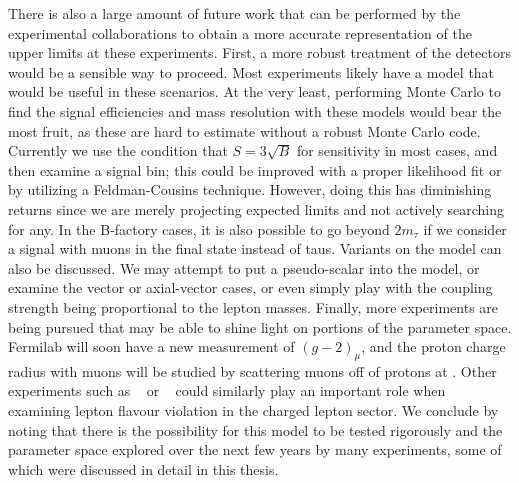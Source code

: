 There is also a large amount of future work that can be performed by the experimental collaborations to obtain a more accurate representation of the upper limits at these experiments.
First, a more robust treatment of the detectors would be a sensible way to proceed.
Most experiments likely have a \geant model that would be useful in these scenarios.
At the very least, performing Monte Carlo to find the signal efficiencies and mass resolution with these models would bear the most fruit, as these are hard to estimate without a robust Monte Carlo code.
Currently we use the condition that $S = 3\sqrt{B}$ for sensitivity in most cases, and then examine a signal bin; this could be improved with a proper likelihood fit or by utilizing a Feldman-Cousins technique.
However, doing this has diminishing returns since we are merely projecting expected limits and not actively searching for any.
In the B-factory cases, it is also possible to go beyond $2m_\tau$ if we consider a signal with muons in the final state instead of taus.
Variants on the model can also be discussed.
We may attempt to put a pseudo-scalar into the model, or examine the vector or axial-vector cases, or even simply play with the coupling strength being proportional to the lepton masses.
Finally, more experiments are being pursued that may be able to shine light on portions of the parameter space.
Fermilab will soon have a new measurement of $(g-2)_\mu$, and the proton charge radius with muons will be studied by scattering muons off of protons at \muse.
Other experiments such as \mutoe~\cite{Abrams:2012er} or \comet~\cite{Cui:2009zz} could similarly play an important role when examining lepton flavour violation in the charged lepton sector.
We conclude by noting that there is the possibility for this model to be tested rigorously and the parameter space explored over the next few years by many experiments, some of which were discussed in detail in this thesis.
